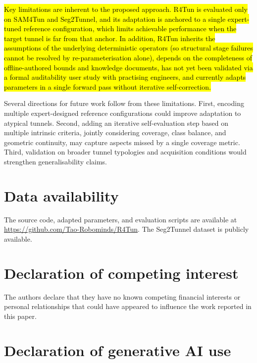 \documentclass[a4paper,fleqn]{cas-dc}
\begin{document}
{\hl{Key limitations are inherent to the proposed approach. R4Tun is evaluated only on SAM4Tun and Seg2Tunnel, and its adaptation is anchored to a single expert-tuned reference configuration, which limits achievable performance when the target tunnel is far from that anchor. In addition, R4Tun inherits the assumptions of the underlying deterministic operators (so structural stage failures cannot be resolved by re-parameterisation alone), depends on the completeness of offline-authored bounds and knowledge documents, has not yet been validated via a formal auditability user study with practising engineers, and currently adapts parameters in a single forward pass without iterative self-correction.}

Several directions for future work follow from these limitations. First, encoding multiple expert-designed reference configurations could improve adaptation to atypical tunnels. Second, adding an iterative self-evaluation step based on multiple intrinsic criteria, jointly considering coverage, class balance, and geometric continuity, may capture aspects missed by a single coverage metric. Third, validation on broader tunnel typologies and acquisition conditions would strengthen generalisability claims.


\section*{Data availability}

The source code, adapted parameters, and evaluation scripts are available at \url{https://github.com/Tao-Robominds/R4Tun}. The Seg2Tunnel dataset is publicly available.

\section*{Declaration of competing interest}

The authors declare that they have no known competing financial interests or personal relationships that could have appeared to influence the work reported in this paper.

\section*{Declaration of generative AI use}

}
\end{document}
